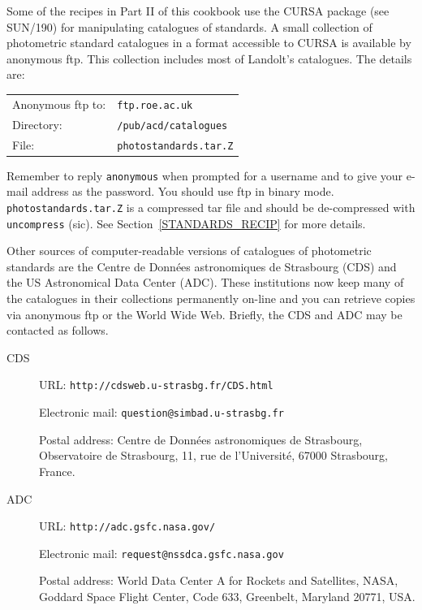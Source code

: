 \documentclass[twoside,11pt]{article}
\newcommand{\htmladdnormallink}[2]{#1}
\newcommand{\xref}[3]{#1}
\begin{document}
Some of the recipes in Part II of this cookbook use the CURSA package
(see \xref{SUN/190}{sun190}{}\cite{SUN190}) for manipulating
catalogues of standards.  A small collection of photometric standard
catalogues in a format accessible to CURSA is available by anonymous
ftp.  This collection includes most of Landolt's catalogues.  The
details are:

\begin{tabular}{ll}
Anonymous ftp to: & {\tt ftp.roe.ac.uk}        \\
Directory:        & {\tt /pub/acd/catalogues}  \\
File:             & {\tt photostandards.tar.Z} \\
\end{tabular}

Remember to reply {\tt anonymous} when prompted for a username and
to give your e-mail address as the password.  You should use ftp in
binary mode.  {\tt photostandards.tar.Z} is a compressed tar file
and should be de-compressed with {\tt uncompress} (sic).  See
Section~\ref{STANDARDS_RECIP} for more details.

Other sources of computer-readable versions of catalogues of photometric
standards are the Centre de Donn\'{e}es astronomiques de Strasbourg (CDS)
and the US Astronomical Data Center (ADC).  These institutions now keep
many of the catalogues in their collections permanently on-line and you
can retrieve copies via anonymous ftp or the World Wide Web.  Briefly,
the CDS and ADC may be contacted as follows.

\begin{description}

  \item[CDS] URL:
  \htmladdnormallink{ {\tt http://cdsweb.u-strasbg.fr/CDS.html} }
   {http://cdsweb.u-strasbg.fr/CDS.html}

   Electronic mail: {\tt question@simbad.u-strasbg.fr}

   Postal address: Centre de Donn\'{e}es astronomiques de
   Strasbourg, Observatoire de Strasbourg, 11, rue de l'Universit\'{e},
   67000 Strasbourg, France.

  \item[ADC]  URL: \htmladdnormallink{ {\tt http://adc.gsfc.nasa.gov/} }
   {http://adc.gsfc.nasa.gov/}

   Electronic mail: {\tt request@nssdca.gsfc.nasa.gov}

   Postal address: World Data Center A for Rockets and
   Satellites, NASA, Goddard Space Flight Center, Code 633,
   Greenbelt, Maryland 20771, USA.

\end{description}
\end{document}
